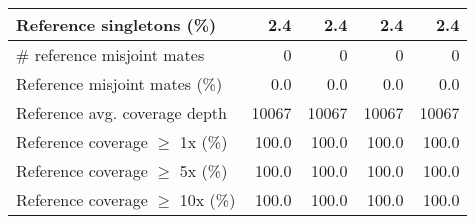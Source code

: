 \documentclass[12pt,a4paper]{article}
\begin{document}
\begin{table}[ht]
\begin{center}
\begin{tabular}{|l*{4}{|r}|}
Reference singletons (\%) & 2.4 & 2.4 & 2.4 & 2.4 \\ \hline
\# reference misjoint mates & 0 & 0 & 0 & 0 \\ \hline
Reference misjoint mates (\%) & 0.0 & 0.0 & 0.0 & 0.0 \\ \hline
Reference avg. coverage depth & 10067 & 10067 & 10067 & 10067 \\ \hline
Reference coverage $\geq$ 1x (\%) & 100.0 & 100.0 & 100.0 & 100.0 \\ \hline
Reference coverage $\geq$ 5x (\%) & 100.0 & 100.0 & 100.0 & 100.0 \\ \hline
Reference coverage $\geq$ 10x (\%) & 100.0 & 100.0 & 100.0 & 100.0 \\ \hline
\end{tabular}
\end{center}
\end{table}
\end{document}

